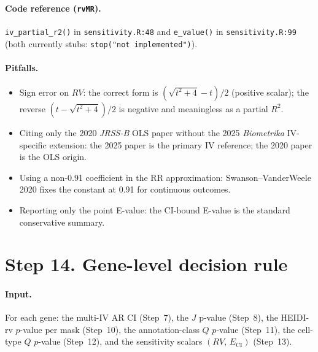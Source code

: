 \documentclass[11pt]{article}
\begin{document}
\paragraph{Code reference (\texttt{rvMR}).} \verb|iv_partial_r2()| in \verb|sensitivity.R:48| and \verb|e_value()| in \verb|sensitivity.R:99| (both currently stubs: \verb|stop("not implemented")|).

\paragraph{Pitfalls.}
\begin{itemize}
\item Sign error on $RV$: the correct form is $(\sqrt{t^2+4}-t)/2$ (positive scalar); the reverse $(t-\sqrt{t^2+4})/2$ is negative and meaningless as a partial $R^2$.
\item Citing only the 2020 \emph{JRSS-B} OLS paper without the 2025 \emph{Biometrika} IV-specific extension: the 2025 paper is the primary IV reference; the 2020 paper is the OLS origin.
\item Using a non-0.91 coefficient in the RR approximation: Swanson--VanderWeele 2020 fixes the constant at 0.91 for continuous outcomes.
\item Reporting only the point E-value: the CI-bound E-value is the standard conservative summary.
\end{itemize}

\section*{Step 14. Gene-level decision rule}

\paragraph{Input.} For each gene: the multi-IV AR CI (Step~7), the $J$ p-value (Step~8), the HEIDI-rv $p$-value per mask (Step~10), the annotation-class $Q$ $p$-value (Step~11), the cell-type $Q$ $p$-value (Step~12), and the sensitivity scalars $(RV,\,E_{\mathrm{CI}})$ (Step~13).
\end{document}
